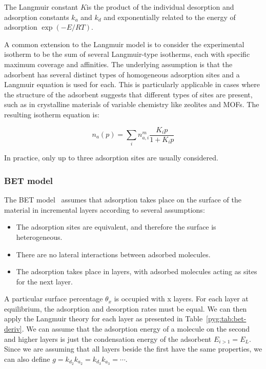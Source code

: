 The Langmuir constant \(K\)is the product of the individual
desorption
and adsorption constants \(k_a\) and \(k_d\) and exponentially
related to the energy of adsorption \(\exp{(-{E}/{RT})}\).

A common extension to the Langmuir model is to consider
the experimental isotherm to be the sum of several Langmuir-type
isotherms, each with specific maximum coverage and affinities.
The underlying assumption is that the adsorbent has several distinct
types of homogeneous adsorption sites and a Langmuir
equation is used for each. This is particularly
applicable in cases where the structure of the adsorbent
suggests that different types of sites are present,
such as in crystalline materials of variable chemistry like
zeolites and MOFs. The resulting isotherm equation is:

\begin{equation}\label{pyg:eqn:langmulti}
	n_a(p) = \sum_i n_{a,i}^m\frac{K_i p}{1+K_i p}
\end{equation}

In practice, only up to three adsorption sites are usually
considered.

\subsubsection{BET model}\label{pyg:models:bet}

The BET model~\cite{brunauerAdsorptionGasesMultimolecular1938}
assumes that adsorption takes place on the surface of the material in
incremental layers according to several assumptions:

\begin{itemize}
	\item The adsorption sites are equivalent, and therefore the
	      surface is heterogeneous.
	\item There are no lateral interactions between adsorbed
	      molecules.
	\item The adsorption takes place in layers, with adsorbed
	      molecules
	      acting as sites for the next layer.
\end{itemize}

A particular surface percentage \(\theta_x\) is occupied with
x layers. For each layer at equilibrium, the adsorption and
desorption rates must be equal.
We can then apply the Langmuir theory for each layer
as presented in Table~\ref{pyg:tab:bet-deriv}. We can
assume that the adsorption energy of a molecule on the second
and higher layers is just the condensation energy of the
adsorbent \(E_{i>1} = E_L\). Since we are assuming that
all layers beside the first have the same properties,
we can also define \(g= {k_{d_2}}{k_{a_2}} = {k_{d_3}}{k_{a_3}} =
\cdots\).

